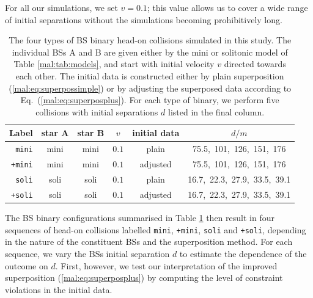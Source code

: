 For all our simulations, we
set $v=0.1$; this value
allows us to cover a wide range of initial separations
without the simulations becoming prohibitively long.
%
\begin{table}[t]
    \centering
    \caption{The four types of BS binary head-on collisions simulated
    in this study. The individual BSs A and B are given either
    by the mini or solitonic model of Table \ref{mal:tab:models},
    and start with initial
    velocity $v$ directed towards each other. The initial data
    is constructed either by plain superposition
    (\ref{mal:eq:superpossimple}) or by adjusting
    the superposed data according to Eq.~(\ref{mal:eq:superposplus}).
    For each type of binary, we perform five collisions with
    initial separations $d$ listed in the final column.
    }
    \begin{tabular}{r|ccccc}
    \hline
    Label & star A & star B & $v$ & initial data & $d/m$ \\
    \hline
    {\tt mini} & mini & mini & $0.1$ & plain &
    75.5,~101,~126,~151,~176 \\
    {\tt +mini}& mini & mini & $0.1$ & adjusted &
    75.5,~101,~126,~151,~176 \\
    {\tt soli} & soli & soli & $0.1$ & plain &
    16.7,~22.3,~27.9,~33.5,~39.1 \\
    {\tt +soli} & soli & soli & $0.1$ &
    adjusted &
    16.7,~22.3,~27.9,~33.5,~39.1 \\
    \hline
    \end{tabular}
    \label{mal:tab:hods}
\end{table}
%
The BS binary configurations
summarised in Table \ref{mal:tab:hods} then result
in four sequences of head-on collisions labelled
{\tt mini}, {\tt +mini}, {\tt soli} and {\tt +soli},
depending in the nature of the constituent BSs and
the superposition method. For each sequence, we vary the
BSs initial separation $d$ to estimate the dependence of the
outcome on $d$. First, however, we test our interpretation
of the improved superposition (\ref{mal:eq:superposplus})
by computing the level of constraint violations in the
initial data.
